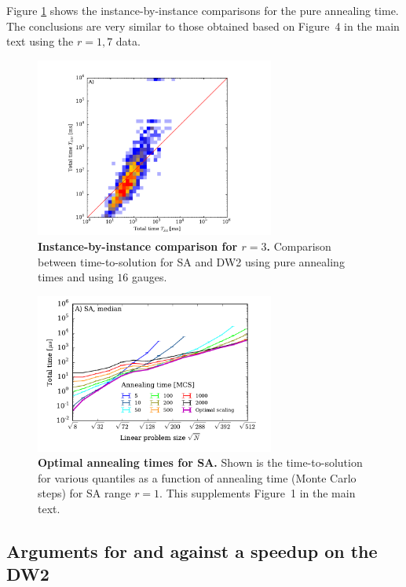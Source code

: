 Figure \ref{fig:ratiosannealingSI3} shows the instance-by-instance comparisons for the pure annealing time. The conclusions are very similar to those obtained based on Figure~4 in the main text using the $r=1,7$ data. \\

\begin{figure}
\centering
\includegraphics[width=0.7\textwidth]{sfigures/sfig06.pdf}
\caption{{\bf Instance-by-instance comparison for $r=3$.} Comparison between time-to-solution for SA and DW2 using pure annealing times and using $16$ gauges. }
\label{fig:ratiosannealingSI3}
\end{figure}


\begin{figure}
\centering
\includegraphics[width=0.7\textwidth]{sfigures/sfig02_leftover.pdf}
\caption{{\bf Optimal annealing times for SA.} Shown is the time-to-solution for various quantiles as a function of annealing time (Monte Carlo steps) for SA range $r=1$. This supplements Figure~1 in the main text.}
\label{fig:leftover02}
\end{figure}

\subsection{Arguments for and against a speedup on the DW2}

